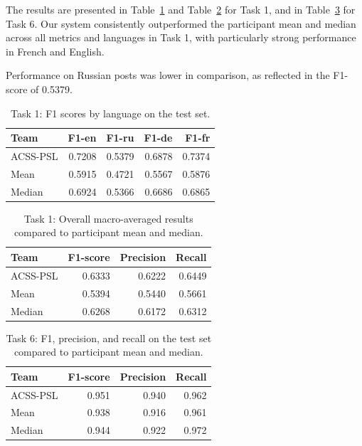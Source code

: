 \documentclass[letterpaper]{article} %
\begin{document}
The results are presented in Table~\ref{tab:task1-lang-results} and Table~\ref{tab:task1-overall} for Task 1, and in Table~\ref{tab:task6-results} for Task 6.
Our system consistently outperformed the participant mean and median across all metrics and languages in Task 1, with particularly strong performance in French and English. 

Performance on Russian posts was lower in comparison, as reflected in the F1-score of 0.5379.

\begin{table}[!htbp]
    \centering
    \caption{Task 1: F1 scores by language on the test set.}
    \label{tab:task1-lang-results}
    \begin{tabular}{l rrrr}
    \toprule
    \textbf{Team} & \textbf{F1-en} & \textbf{F1-ru} & \textbf{F1-de} & \textbf{F1-fr} \\
    \midrule
    ACSS-PSL & 0.7208 & 0.5379 & 0.6878 & 0.7374 \\
    Mean     & 0.5915 & 0.4721 & 0.5567 & 0.5876 \\
    Median   & 0.6924 & 0.5366 & 0.6686 & 0.6865 \\
    \bottomrule
    \end{tabular}
\end{table}

\begin{table}[!htbp]
    \centering
    \caption{Task 1: Overall macro-averaged results compared to participant mean and median.}
    \label{tab:task1-overall}
    \begin{tabular}{l rrr}
    \toprule
    \textbf{Team} & \textbf{F1-score} & \textbf{Precision} & \textbf{Recall} \\
    \midrule
    ACSS-PSL & 0.6333 & 0.6222 & 0.6449 \\
    Mean     & 0.5394 & 0.5440 & 0.5661 \\
    Median   & 0.6268 & 0.6172 & 0.6312 \\
    \bottomrule
    \end{tabular}
\end{table}

\begin{table}[!htbp]
    \centering
    \caption{Task 6: F1, precision, and recall on the test set compared to participant mean and median.}
    \label{tab:task6-results}
    \begin{tabular}{l rrr}
    \toprule
    \textbf{Team} & \textbf{F1-score} & \textbf{Precision} & \textbf{Recall} \\
    \midrule
    ACSS-PSL & 0.951 & 0.940 & 0.962 \\
    Mean     & 0.938 & 0.916 & 0.961 \\
    Median   & 0.944 & 0.922 & 0.972 \\
    \bottomrule
    \end{tabular}
\end{table}
\end{document}
